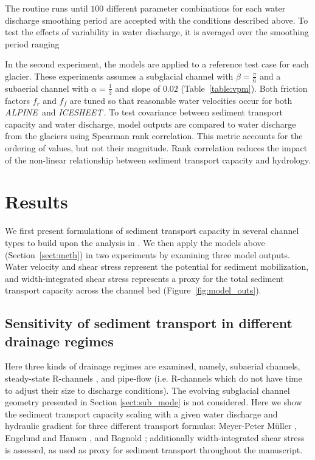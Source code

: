 \documentclass[esurf, manuscript]{copernicus}
\newcommand{\alpine}{\textit{ALPINE}\,}
\newcommand{\icesheet}{\textit{ICESHEET}\,}
\begin{document}
The routine runs until $100$ different parameter combinations for each water discharge smoothing period are accepted with the conditions described above.
To test the effects of variability in water discharge, it is averaged over the smoothing period ranging 

In the second experiment, the models are applied to a reference test case for each glacier.
These experiments assumes  a subglacial channel with $\beta=\frac{\pi}{6}$ and a subaerial channel with $\alpha = \frac{1}{3}$ and slope of $0.02$ (Table~\ref{table:vpm}).
Both friction factors $f_r$ and $f_f$ are tuned so that reasonable water velocities \citep[$\sim\,1.6\,$\unit{m}\,\unit{s}$^{-1}$][]{werder2010b,chandler2013} occur for both \alpine{} and \icesheet{}.
% 
To test covariance between sediment transport capacity and water discharge, model outputs are compared to water discharge from the glaciers using Spearman rank correlation.
This metric accounts for the ordering of values, but not their magnitude.
Rank correlation reduces the impact of the non-linear relationship between sediment transport capacity and hydrology.



\section{Results}
We first present formulations of sediment transport capacity in several channel types to build upon the analysis in \citet{alley1997}.
We then apply the models above (Section~\ref{sect:meth}) in two experiments by examining three model outputs.
Water velocity and shear stress represent the potential for sediment mobilization, and width-integrated shear stress represents a proxy for the total sediment transport capacity across the channel bed (Figure~\ref{fig:model_outs}).

\subsection{Sensitivity of sediment transport in different drainage regimes}
\label{sect:scaling}

Here three kinds of drainage regimes are examined, namely, subaerial channels, steady-state R-channels \citep{rothlisberger1972}, and pipe-flow (i.e. R-channels which do not have time to adjust their size to discharge conditions).
The evolving subglacial channel geometry presented in Section \ref{sect:sub_mode} is not considered.
Here we show the sediment transport capacity scaling with a given water discharge and hydraulic gradient for three different transport formulas: Meyer-Peter M\"uller  \citep[MPM; ][]{meyer1948}, Engelund and Hansen \citep[EH; ][]{engelund1967}, and Bagnold \citep{bagnold1980}; additionally width-integrated shear stress is assessed, as used as proxy for sediment transport throughout the manuscript.
\end{document}
